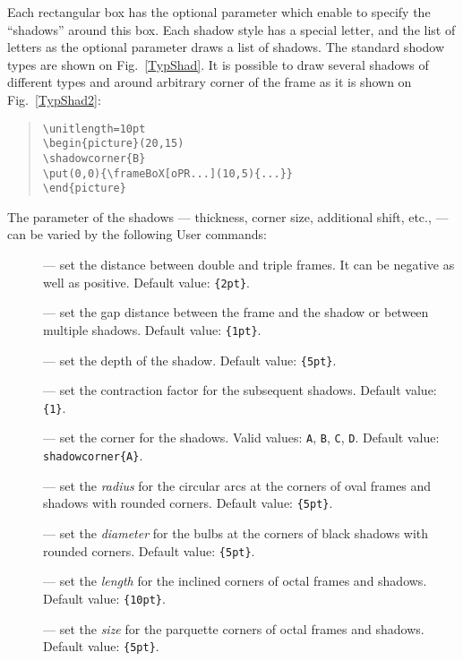 Each rectangular box has the optional parameter which enable to specify
the ``shadows'' around this box. Each shadow style has a special letter,
and the list of letters as the optional parameter draws a list of shadows.
The standard shodow types are shown on Fig.~\ref{TypShad}.
It is possible to draw several shadows of different types
and around arbitrary corner of the frame as it is shown
on Fig.~\ref{TypShad2}:
\begin{quote}
\begin{verbatim}
\unitlength=10pt
\begin{picture}(20,15)
\shadowcorner{B}
\put(0,0){\frameBoX[oPR...](10,5){...}}
\end{picture}
\end{verbatim}
\end{quote}
The parameter of the shadows --- thickness, corner size,
additional shift, etc., --- can be varied
by the following User commands:
\begin{description}
\item[]
    --- set the distance between double and triple
    frames. It can be negative as well as positive.
    Default value: {\tt\framesep\{2pt\}}.
\item[]
    --- set the gap distance between the frame and the shadow
    or between multiple shadows.
    Default value: {\tt\shadowsep\{1pt\}}.
\item[]
    --- set the depth of the shadow.
    Default value: {\tt\shadowsize\{5pt\}}.
\item[]
    --- set the contraction factor for the subsequent shadows.
    Default value: {\tt\shadowshrink\{1\}}.
\item[]
    --- set the corner for the shadows.
    Valid values: {\tt A}, {\tt B}, {\tt C}, {\tt D}.
    Default value: {\tt\bs{}shadowcorner\{A\}}.
\item[]
    --- set the {\em radius} for the circular arcs
    at the corners of oval frames and shadows with rounded corners.
    Default value: {\tt\RoundCorner\{5pt\}}.
\item[]
    --- set the {\em diameter} for the bulbs
    at the corners of black shadows with rounded corners.
    Default value: {\tt\DiskCorner\{5pt\}}.
\item[]
    --- set the {\em length} for the inclined corners
    of octal frames and shadows.
    Default value: {\tt\LineCorner\{10pt\}}.
\item[]
    --- set the {\em size} for the parquette corners
    of octal frames and shadows.
    Default value: {\tt\RectCorner\{5pt\}}.
\end{description}


